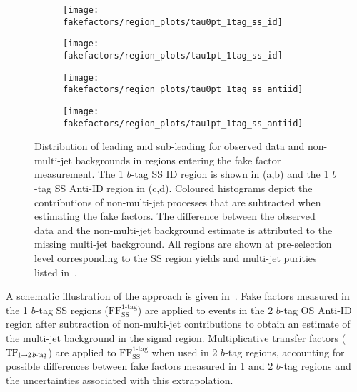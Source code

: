 \begin{figure}[htbp]
  \centering

  \begin{subfigure}{0.49\textwidth}
    \texttt{[image: fakefactors/region\_plots/tau0pt\_1tag\_ss\_id]}
  \end{subfigure}
  \begin{subfigure}{0.49\textwidth}
    \texttt{[image: fakefactors/region\_plots/tau1pt\_1tag\_ss\_id]}
  \end{subfigure}

  \begin{subfigure}{0.49\textwidth}
    \texttt{[image: fakefactors/region\_plots/tau0pt\_1tag\_ss\_antiid]}
  \end{subfigure}
  \begin{subfigure}{0.49\textwidth}
    \texttt{[image: fakefactors/region\_plots/tau1pt\_1tag\_ss\_antiid]}
  \end{subfigure}

  \caption{Distribution of leading and sub-leading \tauhadvis \pT for
    observed data and non-multi-jet backgrounds in regions entering
    the fake factor measurement. The 1 $b$-tag SS ID region is shown
    in (a,b) and the 1 $b$-tag SS Anti-ID region in (c,d). Coloured
    histograms depict the contributions of non-multi-jet processes
    that are subtracted when estimating the fake factors. The
    difference between the observed data and the non-multi-jet
    background estimate is attributed to the missing multi-jet
    background. All regions are shown at pre-selection level
    corresponding to the SS region yields and multi-jet purities
    listed in~.}%
  \label{fig:mjfakes_1tag_ss_plots}
\end{figure}

A schematic illustration of the approach is given
in~. Fake factors measured in the 1
$b$-tag SS regions ($\text{FF}_\text{SS}^\text{1-tag}$) are applied to
events in the 2 $b$-tag OS Anti-ID region after subtraction of
non-multi-jet contributions to obtain an estimate of the multi-jet
background in the signal region. Multiplicative transfer factors
($\text{TF}_{1 \rightarrow 2\,b\text{-tag}}$) are applied to
$\text{FF}_\text{SS}^\text{1-tag}$ when used in 2 $b$-tag regions,
accounting for possible differences between fake factors measured in 1
and 2 $b$-tag regions and the uncertainties associated with this
extrapolation.

